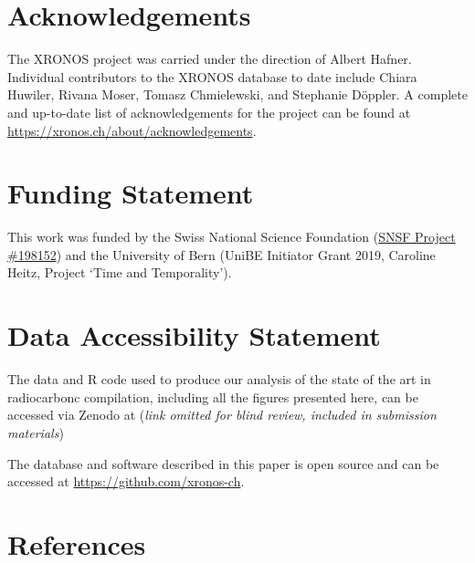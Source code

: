 \documentclass[
  number,
  review]{elsarticle}
\begin{document}
\section{Acknowledgements}\label{acknowledgements}

The XRONOS project was carried under the direction of Albert Hafner.
Individual contributors to the XRONOS database to date include Chiara
Huwiler, Rivana Moser, Tomasz Chmielewski, and Stephanie Döppler. A
complete and up-to-date list of acknowledgements for the project can be
found at \url{https://xronos.ch/about/acknowledgements}.

\section{Funding Statement}\label{funding-statement}

This work was funded by the Swiss National Science Foundation
(\href{https://data.snf.ch/grants/grant/198153}{SNSF Project \#198152})
and the University of Bern (UniBE Initiator Grant 2019, Caroline Heitz,
Project `Time and Temporality').

\section{Data Accessibility
Statement}\label{data-accessibility-statement}

The data and R code used to produce our analysis of the state of the art
in radiocarbonc compilation, including all the figures presented here,
can be accessed via Zenodo at (\emph{link omitted for blind review,
included in submission materials})

The database and software described in this paper is open source and can
be accessed at \url{https://github.com/xronos-ch}.

\section*{References}\label{references}
\end{document}
